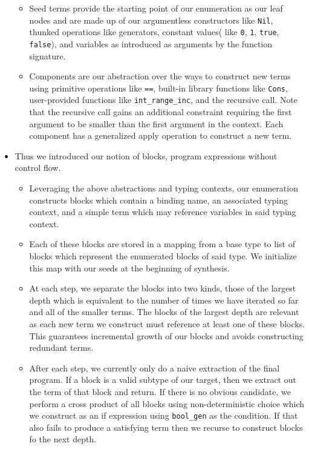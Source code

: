 \documentclass[review, sigplan]{acmart}
\begin{document}
\begin{itemize}
          \begin{itemize}
              \item Seed terms provide the starting point of our enumeration as our leaf nodes and are made up of our argumentless constructors like \texttt{Nil}, thunked operations like generators, constant values( like \texttt{0}, \texttt{1}, \texttt{true}, \texttt{false}), and variables as introduced as arguments by the function signature.
              \item Components are our abstraction over the ways to construct new terms using primitive operations like \texttt{==}, built-in library functions like \texttt{Cons}, user-provided functions like \texttt{int\_range\_inc}, and the recursive call. Note that the recursive call gains an additional constraint requiring the first argument to be smaller than the first argument in the context. Each component has a generalized apply operation to construct a new term.
          \end{itemize}
    \item Thus we introduced our notion of blocks, program expressions without control flow.
          \begin{itemize}
              \item Leveraging the above abstractions and typing contexts,
                    our enumeration constructs blocks which contain a binding name,
                    an associated typing context, and a simple term which may
                    reference variables in said typing context.
              \item Each of these blocks are stored in a mapping from a base type
                    to list of blocks which represent the enumerated blocks of
                    said type.
                    We initialize this map with our seeds at the beginning of synthesis.
              \item At each step, we separate the blocks into two kinds, those
                    of the largest depth which is equivalent to the number of times
                    we have iterated so far and all of the smaller terms.
                    The blocks of the largest depth are relevant as each new term we
                    construct must reference at least one of these blocks.
                    This guarantees incremental growth of our blocks and avoids constructing redundant terms.
              \item After each step, we currently only do a naive extraction of the
                    final program.
                    If a block is a valid subtype of our target, then we extract out
                    the term of that block and return.
                    If there is no obvious candidate, we perform a cross product of
                    all blocks using non-deterministic choice which we construct as
                    an if expression using \texttt{bool\_gen} as the condition.
                    If that also fails to produce a satisfying term then we
                    recurse to construct blocks fo the next depth.
          \end{itemize}

\end{itemize}
\end{document}
